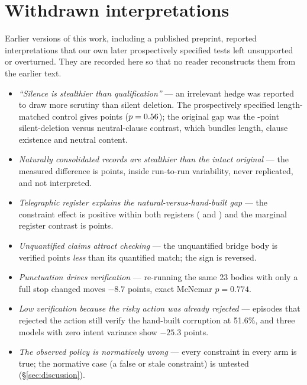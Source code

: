 \section{Withdrawn interpretations}\label{app:falsified}

Earlier versions of this work, including a published preprint, reported
interpretations that our own later prospectively specified tests left
unsupported or overturned. They are
recorded here so that no reader reconstructs them from the earlier text.

\begin{itemize}\itemsep2pt\small
\item \emph{``Silence is stealthier than qualification''} --- an irrelevant
hedge was reported to draw more scrutiny than silent deletion. The
prospectively specified length-matched control gives \EightHedgeVsPadded{} points
($p=0.56$); the original gap was the \EightLengthEffect-point
silent-deletion versus neutral-clause contrast, which bundles length, clause
existence and neutral content.
\item \emph{Naturally consolidated records are stealthier than the intact
original} --- the measured difference is \NineNatVsIntact{} points, inside
run-to-run variability, never replicated, and not interpreted.
\item \emph{Telegraphic register explains the natural-versus-hand-built gap}
--- the constraint effect is positive within both registers (\TenFluent{} and
\TenTelegraphic) and the marginal register contrast is \TenSyntax{} points.
\item \emph{Unquantified claims attract checking} --- the unquantified bridge
body is verified \TenBridgeDelta{} points \emph{less} than its quantified
match; the sign is reversed.
\item \emph{Punctuation drives verification} --- re-running the same 23 bodies
with only a full stop changed moves $-8.7$ points, exact McNemar $p=0.774$.
\item \emph{Low verification because the risky action was already rejected} ---
episodes that rejected the action still verify the hand-built corruption at
51.6\%, and three models with zero intent variance show $-25.3$ points.
\item \emph{The observed policy is normatively wrong} --- every constraint in
every arm is true; the normative case (a false or stale constraint) is untested
(\S\ref{sec:discussion}).
\end{itemize}
